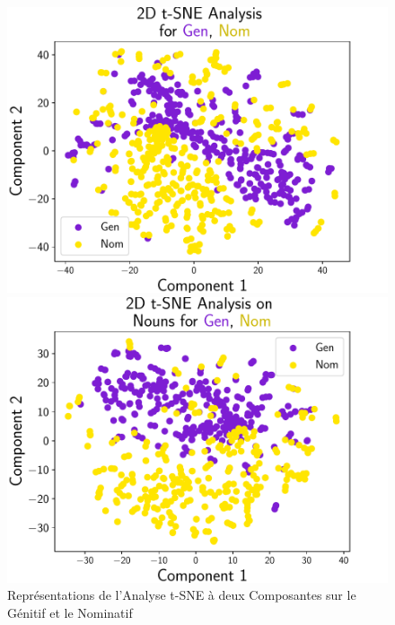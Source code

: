 \documentclass{cours}
\begin{document}
\begin{figure}
\begin{minipage}{.5\textwidth}
	\begin{center}
	\includegraphics[width=\linewidth]{Figures/Visualisations/tsne_Gen_Nom.pdf}
	\end{center}
\end{minipage}
\begin{minipage}{.5\textwidth}
	\begin{center}
	\includegraphics[width=\linewidth]{Figures/Visualisations/tsne_Gen_Nom_Nouns.pdf}
	\end{center}
\end{minipage}
\caption{Représentations de l'Analyse t-SNE à deux Composantes sur le Génitif et le Nominatif}
\label{fig_tsne}
\end{figure}
\end{document}
